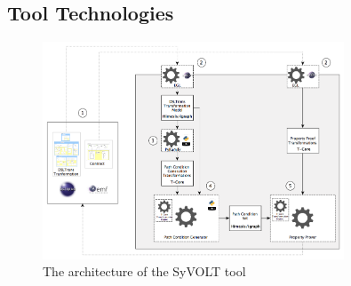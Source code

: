 %
%
%


\subsection{Tool Technologies}
\begin{figure}
\centering
\includegraphics[width=0.8\textwidth]{figures/syvolt_prover/tooling_arch}
\caption{The architecture of the SyVOLT tool}
\label{fig:arch}
\end{figure}

